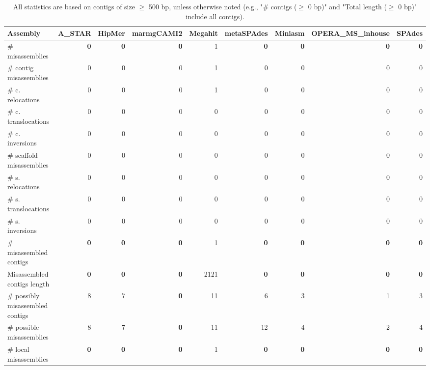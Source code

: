 \documentclass[12pt,a4paper]{article}
\begin{document}
\begin{table}[ht]
\begin{center}
\caption{All statistics are based on contigs of size $\geq$ 500 bp, unless otherwise noted (e.g., "\# contigs ($\geq$ 0 bp)" and "Total length ($\geq$ 0 bp)" include all contigs).}
\begin{tabular}{|l*{8}{|r}|}
\hline
Assembly & A\_STAR & HipMer & marmgCAMI2 & Megahit & metaSPAdes & Miniasm & OPERA\_MS\_inhouse & SPAdes \\ \hline
\# misassemblies & {\bf 0} & {\bf 0} & {\bf 0} & 1 & {\bf 0} & {\bf 0} & {\bf 0} & {\bf 0} \\ \hline
\hspace{2mm}\# contig misassemblies & 0 & 0 & 0 & 1 & 0 & 0 & 0 & 0 \\ \hline
\hspace{5mm}\# c. relocations & 0 & 0 & 0 & 1 & 0 & 0 & 0 & 0 \\ \hline
\hspace{5mm}\# c. translocations & 0 & 0 & 0 & 0 & 0 & 0 & 0 & 0 \\ \hline
\hspace{5mm}\# c. inversions & 0 & 0 & 0 & 0 & 0 & 0 & 0 & 0 \\ \hline
\hspace{2mm}\# scaffold misassemblies & 0 & 0 & 0 & 0 & 0 & 0 & 0 & 0 \\ \hline
\hspace{5mm}\# s. relocations & 0 & 0 & 0 & 0 & 0 & 0 & 0 & 0 \\ \hline
\hspace{5mm}\# s. translocations & 0 & 0 & 0 & 0 & 0 & 0 & 0 & 0 \\ \hline
\hspace{5mm}\# s. inversions & 0 & 0 & 0 & 0 & 0 & 0 & 0 & 0 \\ \hline
\# misassembled contigs & {\bf 0} & {\bf 0} & {\bf 0} & 1 & {\bf 0} & {\bf 0} & {\bf 0} & {\bf 0} \\ \hline
Misassembled contigs length & {\bf 0} & {\bf 0} & {\bf 0} & 2121 & {\bf 0} & {\bf 0} & {\bf 0} & {\bf 0} \\ \hline
\# possibly misassembled contigs & 8 & 7 & {\bf 0} & 11 & 6 & 3 & 1 & 3 \\ \hline
\hspace{5mm}\# possible misassemblies & 8 & 7 & {\bf 0} & 11 & 12 & 4 & 2 & 4 \\ \hline
\# local misassemblies & {\bf 0} & {\bf 0} & {\bf 0} & 1 & {\bf 0} & {\bf 0} & {\bf 0} & {\bf 0} \\ \hline

\end{tabular}
\end{center}
\end{table}
\end{document}
